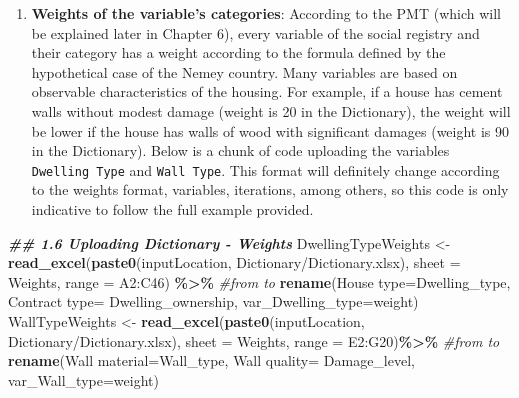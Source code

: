 \documentclass[
]{article}
\newenvironment{Shaded}{\begin{snugshade}}{\end{snugshade}}
\newcommand{\AttributeTok}[1]{\textcolor[rgb]{0.13,0.29,0.53}{#1}}
\newcommand{\CommentTok}[1]{\textcolor[rgb]{0.56,0.35,0.01}{\textit{#1}}}
\newcommand{\DocumentationTok}[1]{\textcolor[rgb]{0.56,0.35,0.01}{\textbf{\textit{#1}}}}
\newcommand{\FunctionTok}[1]{\textcolor[rgb]{0.13,0.29,0.53}{\textbf{#1}}}
\newcommand{\NormalTok}[1]{#1}
\newcommand{\OtherTok}[1]{\textcolor[rgb]{0.56,0.35,0.01}{#1}}
\newcommand{\SpecialCharTok}[1]{\textcolor[rgb]{0.81,0.36,0.00}{\textbf{#1}}}
\newcommand{\StringTok}[1]{\textcolor[rgb]{0.31,0.60,0.02}{#1}}
\providecommand{\tightlist}{%
  \setlength{\itemsep}{0pt}\setlength{\parskip}{0pt}}
\begin{document}
\begin{enumerate}
\def\labelenumi{\arabic{enumi}.}
\setcounter{enumi}{2}
\tightlist
\item
  \textbf{Weights of the variable's categories}: According to the PMT
  (which will be explained later in Chapter 6), every variable of the
  social registry and their category has a weight according to the
  formula defined by the hypothetical case of the Nemey country. Many
  variables are based on observable characteristics of the housing. For
  example, if a house has cement walls without modest damage (weight is
  20 in the Dictionary), the weight will be lower if the house has walls
  of wood with significant damages (weight is 90 in the Dictionary).
  Below is a chunk of code uploading the variables
  \texttt{Dwelling\ Type} and \texttt{Wall\ Type}. This format will
  definitely change according to the weights format, variables,
  iterations, among others, so this code is only indicative to follow
  the full example provided.
\end{enumerate}

\begin{Shaded}
\begin{Highlighting}[]
\DocumentationTok{\#\# 1.6 Uploading Dictionary {-} Weights}
\NormalTok{DwellingTypeWeights }\OtherTok{\textless{}{-}} \FunctionTok{read\_excel}\NormalTok{(}\FunctionTok{paste0}\NormalTok{(inputLocation, }\StringTok{\textquotesingle{}Dictionary/Dictionary.xlsx\textquotesingle{}}\NormalTok{), }\AttributeTok{sheet =} \StringTok{\textquotesingle{}Weights\textquotesingle{}}\NormalTok{, }\AttributeTok{range =} \StringTok{\textquotesingle{}A2:C46\textquotesingle{}}\NormalTok{) }\SpecialCharTok{\%\textgreater{}\%}  \CommentTok{\#from to}
  \FunctionTok{rename}\NormalTok{(}\StringTok{\textasciigrave{}}\AttributeTok{House type}\StringTok{\textasciigrave{}}\OtherTok{=}\NormalTok{Dwelling\_type, }\StringTok{\textasciigrave{}}\AttributeTok{Contract type}\StringTok{\textasciigrave{}}\OtherTok{=}\NormalTok{ Dwelling\_ownership, }\AttributeTok{var\_Dwelling\_type=}\NormalTok{weight)}
\NormalTok{WallTypeWeights }\OtherTok{\textless{}{-}} \FunctionTok{read\_excel}\NormalTok{(}\FunctionTok{paste0}\NormalTok{(inputLocation, }\StringTok{\textquotesingle{}Dictionary/Dictionary.xlsx\textquotesingle{}}\NormalTok{), }\AttributeTok{sheet =} \StringTok{\textquotesingle{}Weights\textquotesingle{}}\NormalTok{, }\AttributeTok{range =} \StringTok{\textquotesingle{}E2:G20\textquotesingle{}}\NormalTok{)}\SpecialCharTok{\%\textgreater{}\%} \CommentTok{\#from to}
  \FunctionTok{rename}\NormalTok{(}\StringTok{\textasciigrave{}}\AttributeTok{Wall material}\StringTok{\textasciigrave{}}\OtherTok{=}\NormalTok{Wall\_type, }\StringTok{\textasciigrave{}}\AttributeTok{Wall quality}\StringTok{\textasciigrave{}}\OtherTok{=}\NormalTok{ Damage\_level, }\AttributeTok{var\_Wall\_type=}\NormalTok{weight)}
\end{Highlighting}
\end{Shaded}
\end{document}
